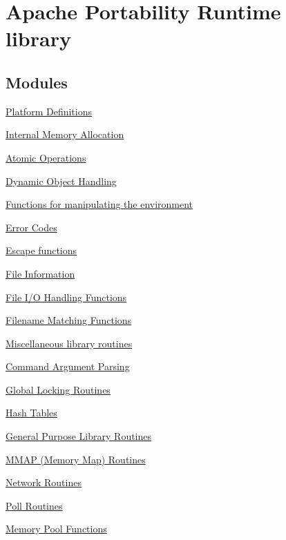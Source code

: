\hypertarget{group___a_p_r}{}\section{Apache Portability Runtime library}
\label{group___a_p_r}
\subsection*{Modules}
\begin{DoxyCompactItemize}
\item 
\hyperlink{group__apr__platform}{Platform Definitions}
\item 
\hyperlink{group__apr__allocator}{Internal Memory Allocation}
\item 
\hyperlink{group__apr__atomic}{Atomic Operations}
\item 
\hyperlink{group__apr__dso}{Dynamic Object Handling}
\item 
\hyperlink{group__apr__env}{Functions for manipulating the environment}
\item 
\hyperlink{group__apr__errno}{Error Codes}
\item 
\hyperlink{group___a_p_r___util___escaping}{Escape functions}
\item 
\hyperlink{group__apr__file__info}{File Information}
\item 
\hyperlink{group__apr__file__io}{File I/\+O Handling Functions}
\item 
\hyperlink{group__apr__fnmatch}{Filename Matching Functions}
\item 
\hyperlink{group__apr__general}{Miscellaneous library routines}
\item 
\hyperlink{group__apr__getopt}{Command Argument Parsing}
\item 
\hyperlink{group___a_p_r___global_mutex}{Global Locking Routines}
\item 
\hyperlink{group__apr__hash}{Hash Tables}
\item 
\hyperlink{group__apr__lib}{General Purpose Library Routines}
\item 
\hyperlink{group__apr__mmap}{M\+M\+A\+P (\+Memory Map) Routines}
\item 
\hyperlink{group__apr__network__io}{Network Routines}
\item 
\hyperlink{group__apr__poll}{Poll Routines}
\item 
\hyperlink{group__apr__pools}{Memory Pool Functions}
\item 

\end{DoxyCompactItemize}
